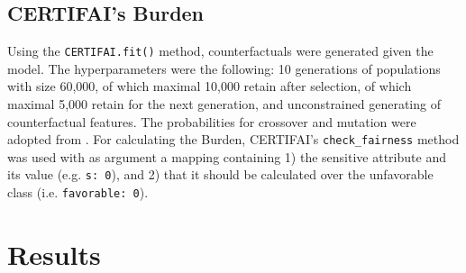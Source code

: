 \documentclass[runningheads]{llncs}
\begin{document}
\subsection{CERTIFAI's Burden}\label{sec:certifai}

Using the \texttt{CERTIFAI.fit()} method, counterfactuals were generated given
the model. The hyperparameters were the following: 10 generations of
populations with size 60,000, of which maximal 10,000 retain after selection,
of which maximal 5,000 retain for the next generation, and unconstrained
generating of counterfactual features. The probabilities for crossover and
mutation were adopted from \cite{certifai}. For calculating the Burden,
CERTIFAI's \texttt{check\_fairness} method was used with as argument a mapping
containing 1) the sensitive attribute and its value (e.g. \texttt{s: 0}), and
2) that it should be calculated over the unfavorable class (i.e.
\texttt{favorable: 0}).

\section{Results}\label{sec:results}
\end{document}
